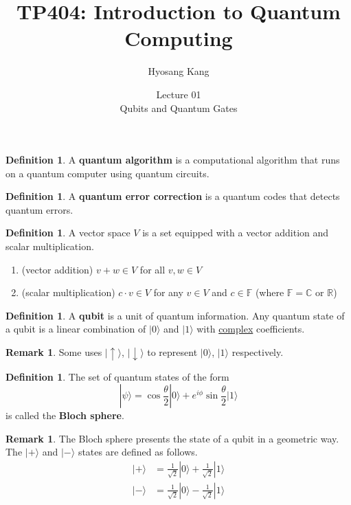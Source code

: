 \documentclass{beamer}
\title[]{TP404: Introduction to Quantum Computing}
\author[]{Hyosang Kang\inst{1}}
\institute[]{\inst{1}Division of Mathematics\\ School of Interdisciplinary Studies\\ DGIST}
\date[]{Lecture 01\\
Qubits and Quantum Gates}
\theoremstyle{plain}
\theoremstyle{definition}
\newtheorem{defn}[thm]{Definition}
\newtheorem{rem}[thm]{Remark}
\begin{document}
\begin{frame}
\titlepage
\end{frame}

\begin{frame}
\begin{defn}
A \textbf{quantum algorithm} is a computational algorithm 
that runs on a quantum computer using quantum circuits.
\end{defn}
\begin{defn}
A \textbf{quantum error correction} is a quantum codes that detects quantum errors.
\end{defn}
\end{frame}

\begin{frame}
\begin{defn}
A vector space $V$ is a set equipped with a vector addition and scalar multiplication.
\begin{enumerate}
\item (vector addition) $v+w\in V$ for all $v,w\in V$
\item (scalar multiplication) $c\cdot v\in V$ 
for any $v\in V$ and $c\in\mathbb F$ (where $\mathbb F=\mathbb C$ or $\mathbb R$) 
\end{enumerate}
\end{defn}
\begin{defn}
A \textbf{qubit} is a unit of quantum information. Any quantum state of a qubit
is a linear combination of $|0\rangle$ and $|1\rangle$ with \underline{complex} coefficients.
\end{defn}
\begin{rem}
Some uses $\mid\uparrow\rangle$, $\mid\downarrow\rangle$ to represent $|0\rangle$, $|1\rangle$ respectively.
\end{rem}
\end{frame}

\begin{frame}
\begin{defn}
The set of quantum states of the form 
$$|\psi\rangle = \cos\frac{\theta}{2}|0\rangle + e^{i\phi}\sin\frac{\theta}{2}|1\rangle$$
is called the \textbf{Bloch sphere}.
\end{defn}
\begin{rem}
The Bloch sphere presents the state of a qubit in a geometric way.
The $|+\rangle$ and $|-\rangle$ states are defined as follows.
\begin{align*}
|+\rangle &= \frac{1}{\sqrt2}|0\rangle + \frac{1}{\sqrt2}|1\rangle \\
|-\rangle &= \frac{1}{\sqrt2}|0\rangle - \frac{1}{\sqrt2}|1\rangle 
\end{align*}
\end{rem}
\end{frame}
\end{document}
